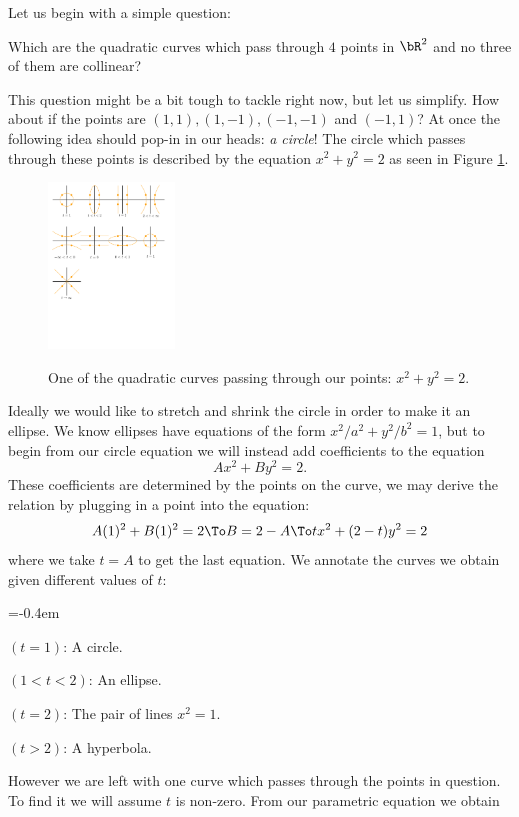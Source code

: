 \documentclass[11pt]{article}
\theoremstyle{definition}
\numberwithin{theorem}{section}
\begin{document}
Let us begin with a simple question:
\begin{significant}
Which are the quadratic curves which pass through $4$ points in $\bR^2$ and no three of them are collinear?
\end{significant}
This question might be a bit tough to tackle right now, but let us simplify. How about if the points are $(1,1),(1,-1),(-1,-1)$ and $(-1,1)$? At once the following idea should pop-in in our heads: \emph{a circle}! The circle which passes through these points is described by the equation $x^2+y^2=2$ as seen in Figure \ref{fig1}.
\begin{figure}[h!]
    \centering
    \includegraphics[width=0.3\textwidth, trim= 0.8cm 22.9cm 16cm 0.6cm,clip]{fig1.pdf}
    \label{fig1}
    \caption{One of the quadratic curves passing through our points: $x^2+y^2=2$.}
\end{figure}
Ideally we would like to stretch and shrink the circle in order to make it an ellipse. We know ellipses have equations of the form $x^2/a^2+y^2/b^2=1$, but to begin from our circle equation we will instead add coefficients to the equation 
$$Ax^2+By^2=2.$$
These coefficients are determined by the points on the curve, we may derive the relation by plugging in a point into the equation:
$$A(1)^2+B(1)^2=2\To B=2-A\To tx^2+(2-t)y^2=2$$
where we take $t=A$ to get the last equation.
We annotate the curves we obtain given different values of $t$:
\vspace{-0.5em}
\begin{itemize}
    \begin{multicols}{2}
        \itemsep=-0.4em
    \item $(t=1)$: A circle.
    \item $(1<t<2)$: An ellipse.
    \item $(t=2)$: The pair of lines $x^2=1$.
    \item $(t>2)$: A hyperbola.
    \end{multicols}
\end{itemize}
However we are left with one curve which passes through the points in question. To find it we will assume $t$ is non-zero. From our parametric equation we obtain 
\end{document}
